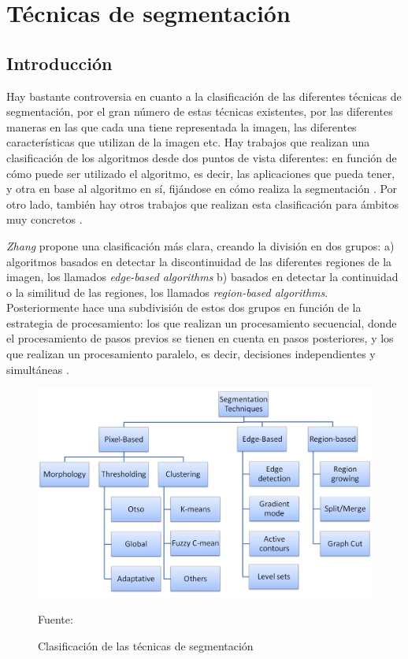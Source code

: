 \chapter{T\'{e}cnicas de segmentaci\'{o}n}

\section{Introducci\'{o}n}

Hay bastante controversia en cuanto a la clasificaci\'{o}n de las diferentes t\'{e}cnicas de segmentaci\'{o}n, por el gran n\'{u}mero de estas t\'{e}cnicas existentes, por las diferentes maneras en las que cada una tiene representada la imagen, las diferentes caracter\'{i}sticas que utilizan de la imagen etc. Hay trabajos que realizan una clasificaci\'{o}n de los algoritmos desde dos puntos de vista diferentes: en funci\'{o}n de c\'{o}mo puede ser utilizado el algoritmo, es decir, las aplicaciones que pueda tener, y otra en base al algoritmo en s\'{i}, fij\'{a}ndose en c\'{o}mo realiza la segmentaci\'{o}n \cite{mc1}. Por otro lado, tambi\'{e}n hay otros trabajos que realizan esta clasificaci\'{o}n para \'{a}mbitos muy concretos \cite[pag. 11]{mc1}.

\textit{Zhang}\cite{zhang1} propone una clasificaci\'{o}n m\'{a}s clara, creando la divisi\'{o}n en dos grupos: a) algoritmos basados en detectar la discontinuidad de las diferentes regiones de la imagen, los llamados \textit{edge-based algorithms} b) basados en detectar la continuidad o la similitud de las regiones, los llamados \textit{region-based algorithms}. Posteriormente hace una subdivisi\'{o}n de estos dos grupos en funci\'{o}n de la estrategia de procesamiento: los que realizan un procesamiento secuencial, donde el procesamiento de pasos previos se tienen en cuenta en pasos posteriores, y los que realizan un procesamiento paralelo, es decir, decisiones independientes y simult\'{a}neas \cite{zhang1}.

\begin{figure}[ht]
	\centering
	\captionsetup{justification=centering}
	\includegraphics[width=1\textwidth]{./imagenes/tecnicasSegmentacion2}
	\caption{Clasificaci\'{o}n de las t\'{e}cnicas de segmentaci\'{o}n}
	\vspace{2 mm}			
	Fuente: \cite{basa1}
	\label{tecnicasSegmentacion}
\end{figure}

